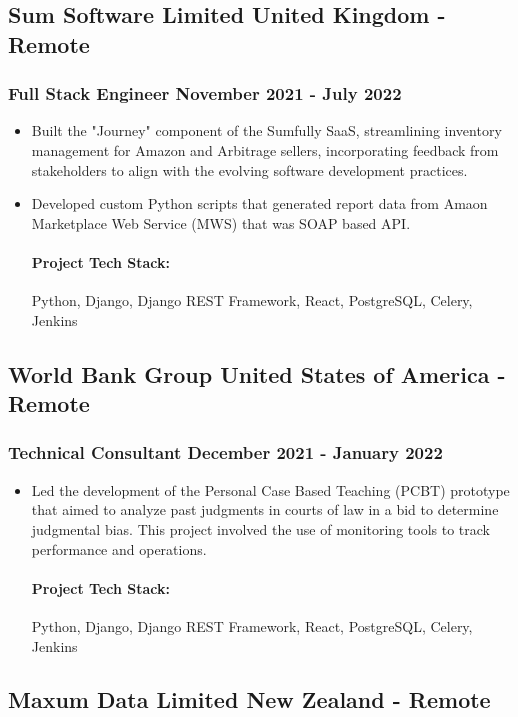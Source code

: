 \documentclass[11pt]{article} %
\begin{document}
\subsection{Sum Software Limited \hfill United Kingdom - Remote}
\subsubsection{Full Stack Engineer \hfill  November 2021 - July 2022}
\begin{itemize}
    \item Built the "Journey" component of the Sumfully SaaS, streamlining inventory management for Amazon and Arbitrage sellers, incorporating feedback from stakeholders to align with the evolving software development practices.
    \item Developed custom Python scripts that generated report data from Amaon Marketplace Web Service (MWS) that was SOAP based API.

    \paragraph{Project Tech Stack:} Python, Django, Django REST Framework, React, PostgreSQL, Celery, Jenkins
\end{itemize}


\subsection{World Bank Group \hfill United States of America - Remote}
\subsubsection{Technical Consultant \hfill  December 2021 - January 2022}
\begin{itemize}
    \item Led the development of the Personal Case Based Teaching (PCBT) prototype that aimed to analyze past judgments in courts of law in a bid to determine judgmental bias. This project involved the use of monitoring tools to track performance and operations.

    \paragraph{Project Tech Stack:} Python, Django, Django REST Framework, React, PostgreSQL, Celery, Jenkins
\end{itemize}


\subsection{Maxum Data Limited \hfill New Zealand - Remote}
\end{document}
